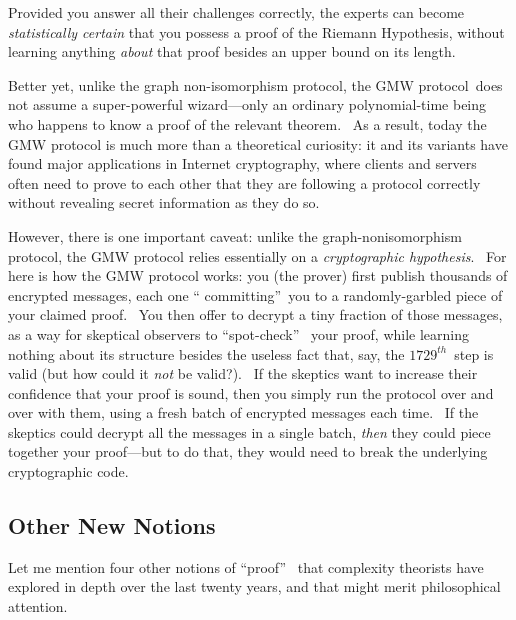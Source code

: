 \documentclass[12pt,onecolumn]{article}%
\begin{document}
Provided you answer all their challenges correctly, the experts can become
\textit{statistically certain} that you possess a proof of the Riemann
Hypothesis, without learning anything \textit{about} that proof besides an
upper bound on its length.

Better yet, unlike the graph non-isomorphism protocol, the GMW protocol\ does
not assume a super-powerful wizard---only an ordinary polynomial-time being
who happens to know a proof of the relevant theorem. \ As a result, today the
GMW protocol is much more than a theoretical curiosity: it and its variants
have found major applications in Internet cryptography, where clients and
servers often need to prove to each other that they are following a protocol
correctly without revealing secret information as they do so.

However, there is one important caveat: unlike the graph-nonisomorphism
protocol, the GMW protocol relies essentially on a \textit{cryptographic
hypothesis}. \ For here is how the GMW protocol works: you (the prover) first
publish thousands of encrypted messages, each one \textquotedblleft
committing\textquotedblright\ you to a randomly-garbled piece of your claimed
proof. \ You then offer to decrypt a tiny fraction of those messages, as a way
for skeptical observers to \textquotedblleft spot-check\textquotedblright%
\ your proof, while learning nothing about its structure besides the useless
fact that, say, the $1729^{th}$\ step is valid (but how could it \textit{not}
be valid?). \ If the skeptics want to increase their confidence that your
proof is sound, then you simply run the protocol over and over with them,
using a fresh batch of encrypted messages each time. \ If the skeptics could
decrypt all the messages in a single batch, \textit{then} they could piece
together your proof---but to do that, they would need to break the underlying
cryptographic code.

\subsection{Other New Notions\label{OTHERNEW}}

Let me mention four other notions of \textquotedblleft proof\textquotedblright%
\ that complexity theorists have explored in depth over the last twenty years,
and that might merit philosophical attention.
\end{document}
